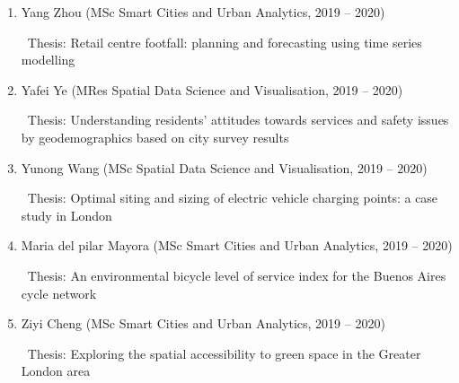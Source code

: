 \documentclass[A4,11pt]{article}
\newcommand{\MScStduentItem}[4]{
  \item #1 (#2, #3)
   \begin{itemize}
    \textendash \ #4
   \end{itemize}
}
\begin{document}
\begin{enumerate}
\begin{enumerate}
\begin{enumerate}
           {Thesis: Can we predict why people travel within a city? A cast study in Montreal, Canada}
          \MScStduentItem{Yang Zhou}{MSc Smart Cities and Urban Analytics}{2019 -- 2020}
           {Thesis: Retail centre footfall: planning and forecasting using time series modelling}
          \MScStduentItem{Yafei Ye}{MRes Spatial Data Science and Visualisation}{2019 -- 2020}
           {Thesis: Understanding residents’ attitudes towards services and safety issues by geodemographics based on city survey results}
          \MScStduentItem{Yunong Wang}{MSc Spatial Data Science and Visualisation}{2019 -- 2020}
           {Thesis: Optimal siting and sizing of electric vehicle charging points: a case study in London}
          \MScStduentItem{Maria del pilar Mayora}{MSc Smart Cities and Urban Analytics}{2019 -- 2020}
           {Thesis: An environmental bicycle level of service index for the Buenos Aires cycle network}
          \MScStduentItem{Ziyi Cheng}{MSc Smart Cities and Urban Analytics}{2019 -- 2020}
           {Thesis: Exploring the spatial accessibility to green space in the Greater London area}

       \end{enumerate}
     \end{enumerate}
\end{enumerate}  

\begin{comment}
Ideally the title of the work should speak for what it is. However if you feel
like you should explain more about why the project is applicable to this job,
use item list as is shown in the work experience section.
\end{comment}
\end{document}
